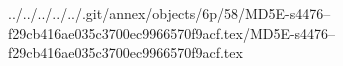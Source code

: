../../../../../.git/annex/objects/6p/58/MD5E-s4476--f29cb416ae035c3700ec9966570f9acf.tex/MD5E-s4476--f29cb416ae035c3700ec9966570f9acf.tex